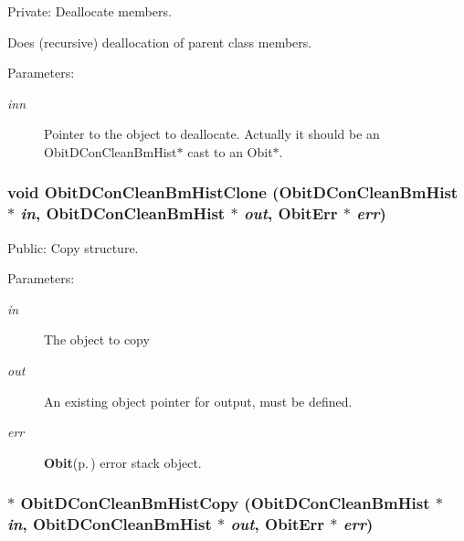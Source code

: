 Private: Deallocate members. 

Does (recursive) deallocation of parent class members. \begin{Desc}
\item[Parameters:]
\begin{description}
\item[{\em inn}]Pointer to the object to deallocate. Actually it should be an Obit\-DCon\-Clean\-Bm\-Hist$\ast$ cast to an Obit$\ast$. \end{description}
\end{Desc}
\subsubsection{\setlength{\rightskip}{0pt plus 5cm}void Obit\-DCon\-Clean\-Bm\-Hist\-Clone ({\bf Obit\-DCon\-Clean\-Bm\-Hist} $\ast$ {\em in}, {\bf Obit\-DCon\-Clean\-Bm\-Hist} $\ast$ {\em out}, {\bf Obit\-Err} $\ast$ {\em err})}\label{ObitDConCleanBmHist_8c_a9}


Public: Copy structure. 

\begin{Desc}
\item[Parameters:]
\begin{description}
\item[{\em in}]The object to copy \item[{\em out}]An existing object pointer for output, must be defined. \item[{\em err}]{\bf Obit}{\rm (p.\,\pageref{structObit})} error stack object. \end{description}
\end{Desc}
\subsubsection{$\ast$ Obit\-DCon\-Clean\-Bm\-Hist\-Copy ({\bf Obit\-DCon\-Clean\-Bm\-Hist} $\ast$ {\em in}, {\bf Obit\-DCon\-Clean\-Bm\-Hist} $\ast$ {\em out}, {\bf Obit\-Err} $\ast$ {\em err})}\label{ObitDConCleanBmHist_8c_a8}


